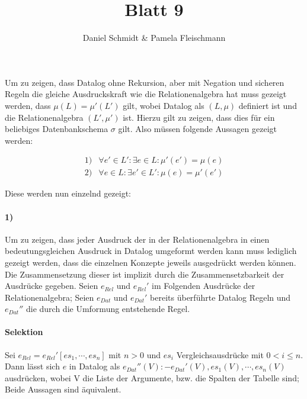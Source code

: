 \documentclass[12pt,a4paper]{amsart}
\begin{document}
\title{Blatt 9}

\author{Daniel Schmidt \& Pamela Fleischmann}

\maketitle

\begin{aufgabe1}
Um zu zeigen, dass Datalog ohne Rekursion, aber mit Negation und sicheren Regeln die gleiche Ausdruckskraft wie die Relationenalgebra hat muss gezeigt werden, dass $\mu(L) = \mu'(L')$ gilt, wobei Datalog als $(L, \mu)$ definiert ist und die Relationenalgebra $(L', \mu')$ ist.
Hierzu gilt zu zeigen, dass dies für ein beliebiges Datenbankschema $\sigma$ gilt.
Also müssen folgende Aussagen gezeigt werden:

\begin{align*}
1) &\forall e' \in L': \exists e \in L: \mu'(e') = \mu(e) \\
2) &\forall e \in L: \exists e' \in L': \mu(e) = \mu'(e')
\end{align*}

Diese werden nun einzelnd gezeigt:

\paragraph{1)}

Um zu zeigen, dass jeder Ausdruck der in der Relationenalgebra in einen bedeutungsgleichen Ausdruck in Datalog umgeformt werden kann muss lediglich gezeigt werden, dass die einzelnen Konzepte jeweils ausgedrückt werden können. Die Zusammensetzung dieser ist implizit durch die Zusammensetzbarkeit der Ausdrücke gegeben. Seien $e_{Rel}$ und $e_{Rel}'$ im Folgenden Ausdrücke der Relationenalgebra; Seien $e_{Dat}$ und $e_{Dat}'$ bereits überführte Datalog Regeln und $e_{Dat}''$ die durch die Umformung entstehende Regel. \\

\paragraph{\textbf{Selektion}}
Sei $e_{Rel} = e_{Rel}'[es_1, \cdots, es_n]$ mit $n > 0$ und $es_i$ Vergleichsausdrücke mit $0 < i \le n$.
Dann lässt sich $e$ in Datalog als $e_{Dat}''(V) :- e_{Dat}'(V), es_1(V), \cdots, es_n(V)$ ausdrücken, wobei V die Liste der Argumente, bzw. die Spalten der Tabelle sind; Beide Aussagen sind äquivalent. \\


\end{aufgabe1}
\end{document}
